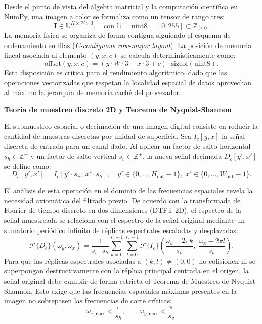 \documentclass[11pt]{article}
\begin{document}
Desde el punto de vista del álgebra matricial y la computación científica en NumPy, una imagen a color se formaliza como un tensor de rango tres:
\begin{equation}
\mathbf{I} \in \mathbb{U}^{H \times W \times 3}, \quad \text{con } \mathbb{U} = \text{uint8} = [0, 255] \subset \mathbb{Z}_{\ge 0}.
\end{equation}
La memoria física se organiza de forma contigua siguiendo el esquema de ordenamiento en filas (\textit{C-contiguous row-major layout}). La posición de memoria lineal asociada al elemento $(y, x, c)$ se calcula determinísticamente como:
\begin{equation}
\text{offset}(y, x, c) = (y \cdot W \cdot 3 + x \cdot 3 + c) \cdot \text{sizeof}(\text{uint8}).
\end{equation}
Esta disposición es crítica para el rendimiento algorítmico, dado que las operaciones vectorizadas que respetan la localidad espacial de datos aprovechan al máximo la jerarquía de memoria caché del procesador.

\textbf{Teoría de muestreo discreto 2D y Teorema de Nyquist-Shannon}

El submuestreo espacial o decimación de una imagen digital consiste en reducir la cantidad de muestras discretas por unidad de superficie. Sea $I_c[y, x]$ la señal discreta de entrada para un canal dado. Al aplicar un factor de salto horizontal $s_h \in \mathbb{Z}^+$ y un factor de salto vertical $s_v \in \mathbb{Z}^+$, la nueva señal decimada $D_c[y', x']$ se define como:
\begin{equation}
D_c[y', x'] = I_c[y' \cdot s_v, \; x' \cdot s_h], \quad y' \in \{0, \ldots, H_{\text{out}}-1\}, \; x' \in \{0, \ldots, W_{\text{out}}-1\}.
\end{equation}

El análisis de esta operación en el dominio de las frecuencias espaciales revela la necesidad axiomática del filtrado previo. De acuerdo con la transformada de Fourier de tiempo discreto en dos dimensiones (DTFT-2D), el espectro de la señal muestreada se relaciona con el espectro de la señal original mediante un sumatorio periódico infinito de réplicas espectrales escaladas y desplazadas:
\begin{equation}
\mathcal{F}\{D_c\}(\omega_y, \omega_x) = \frac{1}{s_v \cdot s_h} \sum_{k=0}^{s_v-1} \sum_{l=0}^{s_h-1} \mathcal{F}\{I_c\}\left( \frac{\omega_y - 2\pi k}{s_v}, \; \frac{\omega_x - 2\pi l}{s_h} \right).
\end{equation}
Para que las réplicas espectrales asociadas a $(k, l) \ne (0, 0)$ no colisionen ni se superpongan destructivamente con la réplica principal centrada en el origen, la señal original debe cumplir de forma estricta el Teorema de Muestreo de Nyquist-Shannon. Esto exige que las frecuencias espaciales máximas presentes en la imagen no sobrepasen las frecuencias de corte críticas:
\begin{equation}
\omega_{x, \text{max}} < \frac{\pi}{s_h}, \qquad \omega_{y, \text{max}} < \frac{\pi}{s_v}.
\end{equation}
\end{document}
